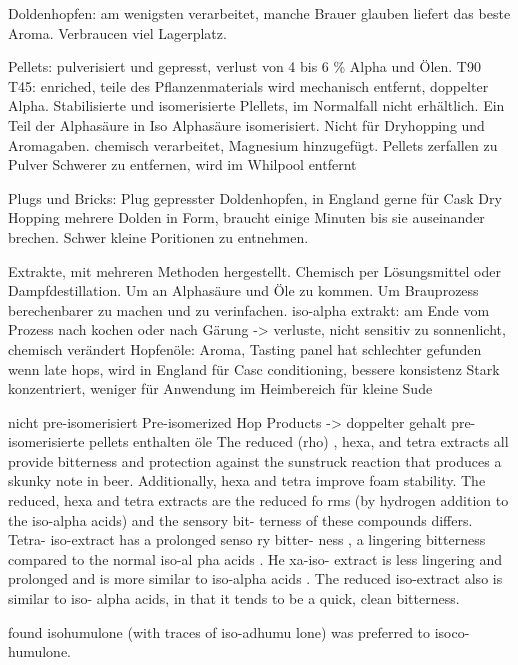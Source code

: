\documentclass[a4paper,parskip=half]{scrartcl}
\begin{document}
\parencite[80\psq]{Garetz1994}
Doldenhopfen: am wenigsten verarbeitet, manche Brauer glauben
liefert das beste Aroma. Verbraucen viel Lagerplatz.

\parencite[82\psqq]{Garetz1994}
Pellets: pulverisiert und gepresst, verlust von 4 bis 6 \% Alpha
und Ölen.
T90
T45: enriched, teile des Pflanzenmaterials wird mechanisch
entfernt, doppelter Alpha.
Stabilisierte und isomerisierte Plellets, im Normalfall nicht
erhältlich. Ein Teil der Alphasäure in Iso Alphasäure
isomerisiert. Nicht für Dryhopping und Aromagaben.
chemisch verarbeitet, Magnesium hinzugefügt.
Pellets zerfallen zu Pulver
Schwerer zu entfernen, wird im Whilpool entfernt \parencite[87]{Garetz1994}

\parencite[84\psq]{Garetz1994}
Plugs und Bricks: 
Plug gepresster Doldenhopfen, in England gerne für Cask Dry Hopping
mehrere Dolden in Form, braucht einige Minuten bis sie auseinander
brechen. Schwer kleine Poritionen zu entnehmen.

\parencite[88-93]{Garetz1994}
Extrakte, mit mehreren Methoden hergestellt. Chemisch per Lösungsmittel
oder Dampfdestillation. Um an Alphasäure und Öle zu kommen.
Um Brauprozess berechenbarer zu machen und zu verinfachen.
iso-alpha extrakt: am Ende vom Prozess nach kochen oder
nach Gärung -> verluste, nicht sensitiv zu sonnenlicht, chemisch verändert
Hopfenöle: Aroma, Tasting panel hat schlechter gefunden wenn
late hops, wird in England für Casc conditioning, bessere konsistenz
Stark konzentriert, weniger für Anwendung im Heimbereich für
kleine Sude

\parencite[52]{Davidson1997}
nicht pre-isomerisiert
Pre-isomerized Hop Products -> doppelter gehalt
pre-isomerisierte pellets enthalten öle
The reduced (rho) , hexa, and tetra extracts
all provide bitterness and protection against
the sunstruck reaction that produces a
skunky note in beer. Additionally, hexa and
tetra improve foam stability.
The
reduced, hexa and tetra extracts are the
reduced fo rms (by hydrogen addition to
the iso-alpha acids) and the sensory bit-
terness of these compounds differs. Tetra-
iso-extract has a prolonged senso ry bitter-
ness , a lingering bitterness compared to
the normal iso-al pha acids . He xa-iso-
extract is less lingering and prolonged and
is more similar to iso-alpha acids . The
reduced iso-extract also is similar to iso-
alpha acids, in that it tends to be a quick,
clean bitterness.

found isohumulone (with traces of
iso-adhumu lone) was preferred to isoco-
humulone.
\end{document}

